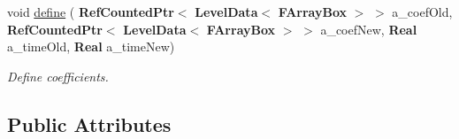 \begin{DoxyCompactItemize}
\item 
\mbox{\label{class_coefficient_interpolator_linear_af6983e0b6efb89666c6e163db00aa79c}} 
void \hyperlink{class_coefficient_interpolator_linear_af6983e0b6efb89666c6e163db00aa79c}{define} (\textbf{ Ref\+Counted\+Ptr}$<$ \textbf{ Level\+Data}$<$ \textbf{ F\+Array\+Box} $>$ $>$ a\+\_\+coef\+Old, \textbf{ Ref\+Counted\+Ptr}$<$ \textbf{ Level\+Data}$<$ \textbf{ F\+Array\+Box} $>$ $>$ a\+\_\+coef\+New, \textbf{ Real} a\+\_\+time\+Old, \textbf{ Real} a\+\_\+time\+New)
\begin{DoxyCompactList}\small\item\em Define coefficients. \end{DoxyCompactList}\end{DoxyCompactItemize}
\subsection*{Public Attributes}
